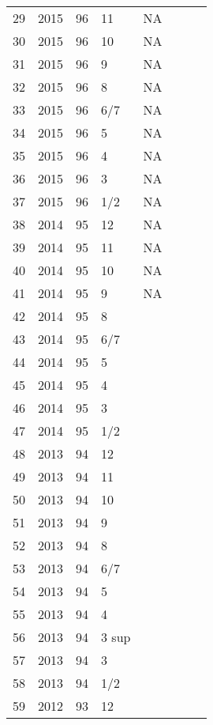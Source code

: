 \begin{longtable}{ |l|l|l|l|l|l|l|l| }
 29 & 2015 & 96 &    11 &      NA &  &  & \\
 30 & 2015 & 96 &    10 &      NA &  &  & \\
 31 & 2015 & 96 &     9 &      NA &  &  & \\
 32 & 2015 & 96 &     8 &      NA &  &  & \\
 33 & 2015 & 96 &   6/7 &      NA  &  &  & \\
 34 & 2015 & 96 &     5 &      NA &  &  & \\
 35 & 2015 & 96 &     4 &      NA &  &  & \\
 36 & 2015 & 96 &     3 &      NA &  &  & \\
 37 & 2015 & 96 &   1/2 &      NA &  &  & \\
 38 & 2014 & 95 &    12 &      NA &  &  & \\
 39 & 2014 & 95 &    11 &      NA &  &  & \\
 40 & 2014 & 95 &    10 &      NA &  &  & \\
 41 & 2014 & 95 &     9 &      NA &  &  & \\
 42 & 2014 & 95 &     8 &         &  &  & \\
 43 & 2014 & 95 &   6/7 &         &  &  & \\
 44 & 2014 & 95 &     5 &         &  &  & \\
 45 & 2014 & 95 &     4 &         &  &  & \\
 46 & 2014 & 95 &     3 &         &  &  & \\
 47 & 2014 & 95 &   1/2 &         &  &  & \\
 48 & 2013 & 94 &    12 &         &  &   & \\
 49 & 2013 & 94 &    11 &         &  &  & \\
 50 & 2013 & 94 &    10 &         &  &  & \\
 51 & 2013 & 94 &     9 &         &  &  & \\
 52 & 2013 & 94 &     8 &         &  &  & \\
 53 & 2013 & 94 &   6/7 &         &  &  & \\
 54 & 2013 & 94 &     5 &         &  &  & \\
 55 & 2013 & 94 &     4 &         &  &  & \\
 56 & 2013 & 94 & 3 sup &         &  &  & \\
 57 & 2013 & 94 &     3 &         &  &  & \\
 58 & 2013 & 94 &   1/2 &         &  &  & \\
 59 & 2012 & 93 &    12 &         &  &  & \\

\end{longtable}

